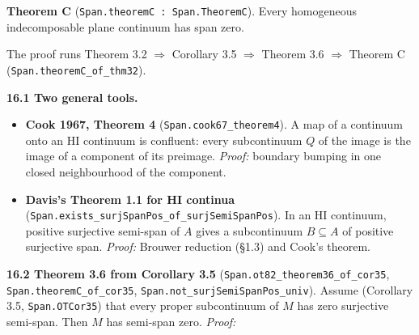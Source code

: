 \documentclass[11pt]{article}
\newcommand{\lean}[1]{\texttt{#1}}
\begin{document}
\textbf{Theorem C} (\lean{Span.\hspace{0pt}theoremC : Span.\hspace{0pt}TheoremC}). Every homogeneous indecomposable plane continuum has span zero.

The proof runs Theorem 3.2 $\Rightarrow$ Corollary 3.5 $\Rightarrow$ Theorem 3.6 $\Rightarrow$ Theorem C (\lean{Span.\hspace{0pt}theoremC\_\hspace{0pt}of\_\hspace{0pt}thm32}).

\textbf{16.1 Two general tools.}

\begin{itemize}
  \item \textbf{Cook 1967, Theorem 4} (\lean{Span.\hspace{0pt}cook67\_\hspace{0pt}theorem4}). A map of a continuum onto an HI continuum is confluent: every subcontinuum $Q$ of the image is the image of a component of its preimage. \emph{Proof:} boundary bumping in one closed neighbourhood of the component.
  \item \textbf{Davis's Theorem 1.1 for HI continua} (\lean{Span.\hspace{0pt}exists\_\hspace{0pt}surjSpanPos\_\hspace{0pt}of\_\hspace{0pt}surjSemiSpanPos}). In an HI continuum, positive surjective semi-span of $A$ gives a subcontinuum $B \subseteq A$ of positive surjective span. \emph{Proof:} Brouwer reduction (\S{}1.3) and Cook's theorem.
\end{itemize}

\textbf{16.2 Theorem 3.6 from Corollary 3.5} (\lean{Span.\hspace{0pt}ot82\_\hspace{0pt}theorem36\_\hspace{0pt}of\_\hspace{0pt}cor35}, \lean{Span.\hspace{0pt}theoremC\_\hspace{0pt}of\_\hspace{0pt}cor35}, \lean{Span.\hspace{0pt}not\_\hspace{0pt}surjSemiSpanPos\_\hspace{0pt}univ}). Assume (Corollary 3.5, \lean{Span.\hspace{0pt}OTCor35}) that every proper subcontinuum of $M$ has zero surjective semi-span. Then $M$ has semi-span zero. \emph{Proof:}
\end{document}
